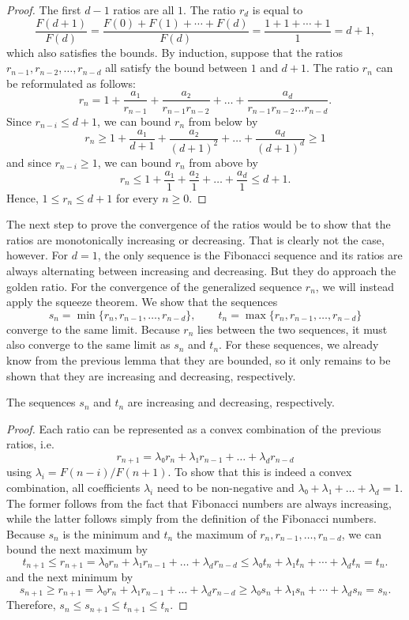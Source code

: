 \begin{proof}
  The first $d - 1$ ratios are all $1$.
  The ratio $r_d$ is equal to
  \[
    \frac{F(d+1)}{F(d)} = \frac{F(0) + F(1) + ⋯ + F(d)}{F(d)} = \frac{1 + 1 + ⋯ + 1}{1} = d + 1,
  \]
  which also satisfies the bounds.
  By induction, suppose that the ratios $r_{n-1}, r_{n-2}, …, r_{n-d}$ all satisfy the bound between $1$ and $d+1$.
  The ratio $r_n$ can be reformulated as follows:
  \[
    r_n = 1 + \frac{a₁}{r_{n-1}} + \frac{a₂}{r_{n-1} r_{n-2}} + \dots + \frac{a_d}{r_{n-1} r_{n-2} \dots r_{n-d}}.
  \]
  Since $r_{n-i} ≤ d+1$, we can bound $r_n$ from below by
  \[
    r_n ≥ 1 + \frac{a₁}{d+1} + \frac{a₂}{(d+1)^2} + \dots + \frac{a_d}{(d+1)^d} ≥ 1
  \]
  and since $r_{n-i} ≥ 1$, we can bound $r_n$ from above by
  \[
    r_n ≤ 1 + \frac{a₁}{1} + \frac{a₂}{1} + \dots + \frac{a_d}{1} ≤ d+1.
  \]
  Hence, $1 ≤ r_n ≤ d+1$ for every $n ≥ 0$.
\end{proof}

The next step to prove the convergence of the ratios would be to show that the
ratios are monotonically increasing or decreasing.
That is clearly not the case, however.
For $d=1$, the only sequence is the Fibonacci sequence and its ratios are
always alternating between increasing and decreasing.
But they do approach the golden ratio.
For the convergence of the generalized sequence $r_n$,
we will instead apply the squeeze theorem.
We show that the sequences
\[
  s_n = \min\{r_n, r_{n-1}, …, r_{n-d} \}, \qquad t_n = \max\{r_n, r_{n-1}, …, r_{n-d}\}
\]
converge to the same limit.
Because $r_n$ lies between the two sequences, it must also converge to the same limit as $s_n$ and $t_n$.
For these sequences, we already know from the previous lemma that they are bounded,
so it only remains to be shown that they are increasing and decreasing,
respectively.

\begin{lemma}
  The sequences $s_n$ and $t_n$ are increasing and decreasing, respectively.
\end{lemma}

\begin{proof}
  Each ratio can be represented as a convex combination of the previous ratios, i.e.
  \[
    r_{n+1} = λ₀ r_n + λ₁ r_{n-1} + \dots + λ_d r_{n-d}
  \]
  using $λ_i = F(n - i) / F(n + 1)$.
  To show that this is indeed a convex combination, all coefficients $λ_i$
  need to be non-negative and $λ₀ + λ₁ + \dots + \lambda_d = 1$.
  The former follows from the fact that Fibonacci numbers are always increasing,
  while the latter follows simply from the definition of the Fibonacci numbers.
  Because $s_n$ is the minimum and $t_n$ the maximum of $r_n, r_{n-1}, …, r_{n-d}$,
  we can bound the next maximum by
  \[
    t_{n+1} ≤ r_{n+1} = λ₀ r_n + λ₁ r_{n-1} + \dots + λ_d r_{n-d} ≤ λ₀ t_n + λ₁ t_n + ⋯ + λ_d t_n = t_n.
  \]
  and the next minimum by
  \[
    s_{n+1} ≥ r_{n+1} = λ₀ r_n + λ₁ r_{n-1} + \dots + λ_d r_{n-d} ≥ λ₀ s_n + λ₁ s_n + ⋯ + λ_d s_n = s_n.
  \]
  Therefore, $s_n ≤ s_{n+1} ≤ t_{n+1} ≤ t_n$.
\end{proof}

